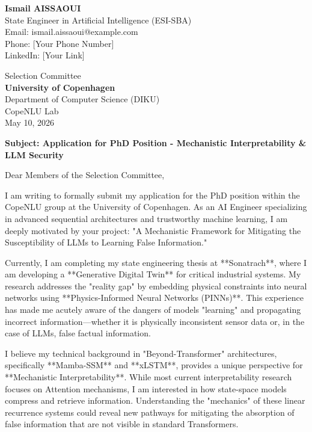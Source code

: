 \documentclass[11pt,a4paper]{article}
\begin{document}
\noindent \textbf{Ismail AISSAOUI} \\
State Engineer in Artificial Intelligence (ESI-SBA) \\
Email: ismail.aissaoui@example.com \\
Phone: [Your Phone Number] \\
LinkedIn: [Your Link]

\bigskip

\begin{flushright}
    Selection Committee \\
    \textbf{University of Copenhagen} \\
    Department of Computer Science (DIKU) \\
    CopeNLU Lab \\
    \medskip
    May 10, 2026
\end{flushright}

\bigskip

\noindent \textbf{Subject: Application for PhD Position - Mechanistic Interpretability \& LLM Security}

\bigskip

Dear Members of the Selection Committee,

I am writing to formally submit my application for the PhD position within the CopeNLU group at the University of Copenhagen. As an AI Engineer specializing in advanced sequential architectures and trustworthy machine learning, I am deeply motivated by your project: "A Mechanistic Framework for Mitigating the Susceptibility of LLMs to Learning False Information."

Currently, I am completing my state engineering thesis at **Sonatrach**, where I am developing a **Generative Digital Twin** for critical industrial systems. My research addresses the "reality gap" by embedding physical constraints into neural networks using **Physics-Informed Neural Networks (PINNs)**. This experience has made me acutely aware of the dangers of models "learning" and propagating incorrect information—whether it is physically inconsistent sensor data or, in the case of LLMs, false factual information.

I believe my technical background in "Beyond-Transformer" architectures, specifically **Mamba-SSM** and **xLSTM**, provides a unique perspective for **Mechanistic Interpretability**. While most current interpretability research focuses on Attention mechanisms, I am interested in how state-space models compress and retrieve information. Understanding the "mechanics" of these linear recurrence systems could reveal new pathways for mitigating the absorption of false information that are not visible in standard Transformers.
\end{document}
